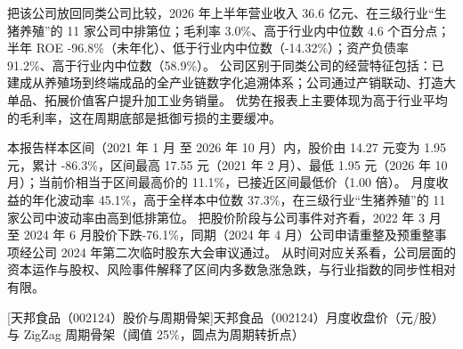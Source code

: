  把该公司放回同类公司比较，2026 年上半年营业收入 36.6 亿元、在三级行业“生猪养殖”的 11 家公司中排第位；毛利率 3.0\%、高于行业内中位数 4.6 个百分点；半年 ROE -96.8\%（未年化）、低于行业内中位数（-14.32\%）；资产负债率 91.2\%、高于行业内中位数（58.9\%）。 公司区别于同类公司的经营特征包括：已建成从养殖场到终端成品的全产业链数字化追溯体系；公司通过产销联动、打造大单品、拓展价值客户提升加工业务销量。 优势在报表上主要体现为高于行业平均的毛利率，这在周期底部是抵御亏损的主要缓冲。

 本报告样本区间（2021 年 1 月 至 2026 年 10 月）内，股价由 14.27 元变为 1.95 元，累计 -86.3\%，区间最高 17.55 元（2021 年 2 月）、最低 1.95 元（2026 年 10 月）；当前价相当于区间最高价的 11.1\%，已接近区间最低价（1.00 倍）。 月度收益的年化波动率 45.1\%，高于全样本中位数 37.3\%，在三级行业“生猪养殖”的 11 家公司中波动率由高到低排第位。 把股价阶段与公司事件对齐看，2022 年 3 月 至 2024 年 6 月股价下跌-76.1\%，同期（2024 年 4 月）公司申请重整及预重整事项经公司 2024 年第二次临时股东大会审议通过。 从时间对应关系看，公司层面的资本运作与股权、风险事件解释了区间内多数急涨急跌，与行业指数的同步性相对有限。

\begin{center}
\begin{minipage}{\textwidth}\centering
{}

[天邦食品（002124）股价与周期骨架]{天邦食品（002124）月度收盘价（元/股）与 ZigZag 周期骨架（阈值 25\%，圆点为周期转折点）}
\end{minipage}
\end{center}

